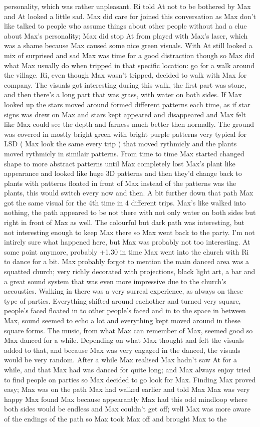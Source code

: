 \documentclass[12pt]{book}
\begin{document}
personality, which was rather unpleasant. Ri told At not to be bothered by Max and At looked a little sad. Max did care for joined this conversation as Max don't like talked to people who assume things about other people without had a clue about Max's personality; Max did stop At from played with Max's laser, which was a shame because Max caused some nice green visuals. With At still looked a mix of surprised and sad Max was time for a good distraction though so Max did what Max usually do when tripped in that specific location: go for a walk around the village. Ri, even though Max wasn't tripped, decided to walk with Max for company. The visuals got interesting during this walk, the first part was stone, and then there's a long part that was grass, with water on both sides. If Max looked up the stars moved around formed different patterns each time, as if star signs was drew on Max and stars kept appeared and disappeared and Max felt like Max could see the depth and farness much better then normally. The ground was covered in mostly bright green with bright purple patterns very typical for LSD ( Max look the same every trip ) that moved rythmicly and the plants moved rythmicly in similair patterns. From time to time Max started changed shape to more abstract patterns until Max completely lost Max's plant like appearance and looked like huge 3D patterns and then they'd change back to plants with patterns floated in front of Max instead of the patterns was the plants, this would switch every now and then. A bit further down that path Max got the same visual for the 4th time in 4 different trips. Max's like walked into nothing, the path appeared to be not there with not only water on both sides but right in front of Max as well. The colourful but dark path was interesting, but not interesting enough to keep Max there so Max went back to the party. I'm not intirely sure what happened here, but Max was probably not too interesting. At some point anymore, probably +1.30 in time Max went into the church with Ri to dance for a bit. Max probably forgot to mention the main danced area was a squatted church; very richly decorated with projections, black light art, a bar and a great sound system that was even more impressive due to the church's accoustics. Walking in there was a very surreal experience, as always on these type of parties. Everything shifted around eachother and turned very square, people's faced floated in to other people's faced and in to the space in between Max, sound seemed to echo a lot and everything kept moved around in these square forms. The music, from what Max can remember of Max, seemed good so Max danced for a while. Depending on what Max thought and felt the visuals added to that, and because Max was very engaged in the danced, the visuals would be very random. After a while Max realised Max hadn't saw At for a while, and that Max had was danced for quite long; and Max always enjoy tried to find people on parties so Max decided to go look for Max. Finding Max proved easy; Max was on the path Max had walked earlier and told Max Max was very happy Max found Max because appearantly Max had this odd mindloop where both sides would be endless and Max couldn't get off; well Max was more aware of the endings of the path so Max took Max off and brought Max to the 
\end{document}
